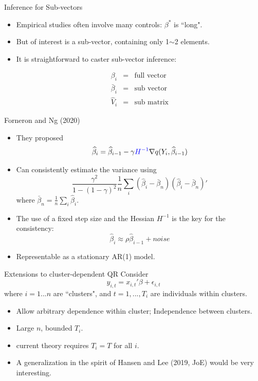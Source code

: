\documentclass[beamer, t]{beamer}
\begin{document}
\begin{frame}{Inference for Sub-vectors}
	
	
	\begin{itemize}
		\item Empirical studies often involve many controls: $\beta^*$ is ``long".
		
		\item But of interest is a sub-vector, containing only 1$\sim$2 elements. 
		
		\item It is straightforward to caster sub-vector inference:
		
		\begin{eqnarray}
			\beta_i&=&  \text{full vector}\\
			\bar\beta_i&=&  \text{sub vector}\\
			\widehat V_i&=&  \text{sub matrix}
		\end{eqnarray}
		
		
	\end{itemize}
	
\end{frame}


\begin{frame}{Forneron and Ng (2020)}
	\begin{itemize}
		\item They proposed 
		$$
		\widehat\beta_i= \widehat\beta_{i-1} -\gamma  \textcolor{blue}{H^{-1}} \nabla q(Y_i, \widehat\beta_{i-1})
		$$
		\item Can consistently estimate the variance using
		$$
		\frac{\gamma^2}{1-(1-\gamma)^2} \frac{1}{n}\sum_i (\widehat\beta_i-\bar\beta_n)(\widehat\beta_i-\bar\beta_n)'
		$$
		where $\bar\beta_n=\frac{1}{n}\sum_i\widehat\beta_i.$
		\item The use of a fixed step size and the Hessian $H^{-1}$ is the key for the consistency: 
		$$
		\widehat\beta_i\approx \rho \widehat\beta_{i-1} + noise 
		$$
		\item Representable as a stationary AR(1) model. 
	\end{itemize}
	
\end{frame}



\begin{frame}{Extensions to cluster-dependent QR}
	Consider 
	$$
	y_{i,t} = x_{i,t}'\beta +\epsilon_{i,t}
	$$
	where $i=1...n$ are ``clusters", and $t=1,...,T_i$ are individuals within clusters.
	
	\begin{itemize}
		\item Allow arbitrary dependence within cluster;  Independence between clusters.
		\item Large $n$, bounded $T_i$.
		\item current theory requires $T_i=T$ for all $i$.
		
		\item A generalization in the spirit of Hansen and Lee (2019, JoE) would be very interesting.
		 
	\end{itemize}
	
\end{frame}
\end{document}
